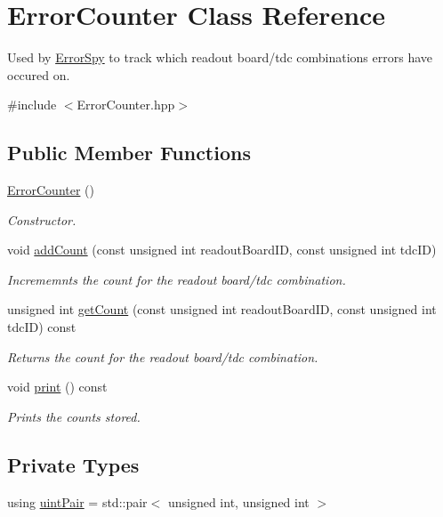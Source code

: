 \hypertarget{class_error_counter}{}\section{Error\+Counter Class Reference}
\label{class_error_counter}


Used by \hyperlink{class_error_spy}{Error\+Spy} to track which readout board/tdc combinations errors have occured on.  




{\ttfamily \#include $<$Error\+Counter.\+hpp$>$}

\subsection*{Public Member Functions}
\begin{DoxyCompactItemize}
\item 
\hyperlink{class_error_counter_a95facfc3369d4cf69b255519c579912e}{Error\+Counter} ()
\begin{DoxyCompactList}\small\item\em Constructor. \end{DoxyCompactList}\item 
void \hyperlink{class_error_counter_a6ef83e5c7eccd70772881294a8dc714b}{add\+Count} (const unsigned int readout\+Board\+ID, const unsigned int tdc\+ID)
\begin{DoxyCompactList}\small\item\em Incrememnts the count for the readout board/tdc combination. \end{DoxyCompactList}\item 
unsigned int \hyperlink{class_error_counter_affc256e518dc91811a48fd5ba42de8cd}{get\+Count} (const unsigned int readout\+Board\+ID, const unsigned int tdc\+ID) const
\begin{DoxyCompactList}\small\item\em Returns the count for the readout board/tdc combination. \end{DoxyCompactList}\item 
void \hyperlink{class_error_counter_a12b0eba237f5de0c56d5365bb84fa025}{print} () const
\begin{DoxyCompactList}\small\item\em Prints the counts stored. \end{DoxyCompactList}\end{DoxyCompactItemize}
\subsection*{Private Types}
\begin{DoxyCompactItemize}
\item 
using \hyperlink{class_error_counter_aa50fc471c675ff8d626b982d1d90c7b4}{uint\+Pair} = std\+::pair$<$ unsigned int, unsigned int $>$
\end{DoxyCompactItemize}
